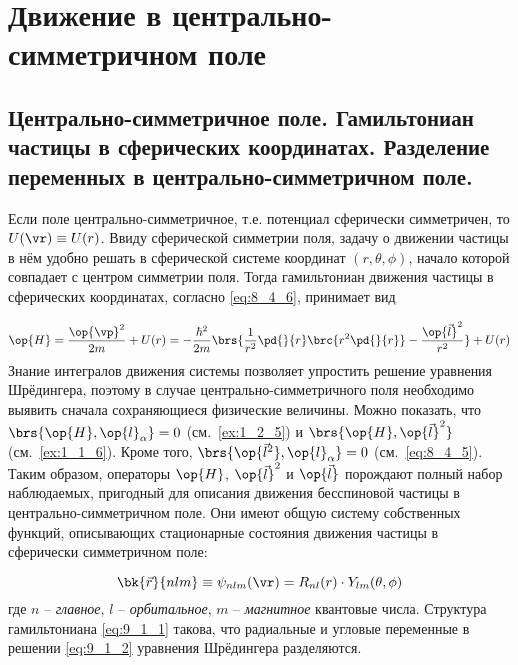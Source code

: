 \chapter{Движение в центрально-симметричном поле}

\begin{sloppypar}
\section{Центрально-симметричное поле. Гамильтониан частицы в сферических координатах. Разделение переменных в центрально-симметричном поле.}
\end{sloppypar}

Если поле центрально-симметричное, т.е. потенциал сферически симметричен, то $U(\vr) \equiv U(r)$. Ввиду сферической симметрии поля, задачу о движении частицы в нём удобно решать в сферической системе координат $(r, \theta, \phi)$, начало которой совпадает с центром симметрии поля. Тогда гамильтониан движения частицы в сферических координатах, согласно \eqref{eq:8_4_6}, принимает вид

\begin{equation}
\label{eq:9_1_1}
\op{H} = \frac{\op{\vp}^2}{2m} + U(r) = - \frac{\hbar^2}{2m} \brs{\frac{1}{r^2} \pd{}{r} \brc{r^2 \pd{}{r}} - \frac{\op{\vec{l}}^2}{r^2}} + U(r)
\end{equation}%
%
Знание интегралов движения системы позволяет упростить решение уравнения Шрёдингера, поэтому в случае центрально-симметричного поля необходимо выявить сначала сохраняющиеся физические величины. Можно показать, что $\brs{\op{H}, \op{l}_\alpha} = 0$ (см.~\cref{ex:1_2_5}) и $\brs{\op{H}, \op{\vec{l}}^2}$ (см.~\cref{ex:1_1_6}). Кроме того, $\brs{\op{\vec{l}^2}, \op{l}_\alpha} = 0$ (см.~\eqref{eq:8_4_5}). Таким образом, операторы $\op{H}$, $\op{\vec{l}}^2$ и $\op{\vec{l}}$ порождают полный набор наблюдаемых, пригодный для описания движения бесспиновой частицы в центрально-симметричном поле. Они имеют общую систему собственных функций, описывающих стационарные состояния движения частицы в сферически симметричном поле:

\begin{equation}
\label{eq:9_1_2}
\bk{\vec{r}}{nlm} \equiv \psi_{nlm}(\vr) = R_{nl}(r) \cdot Y_{lm}(\theta, \phi)
\end{equation}%
%
где $n$ -- {\em главное}, $l$ -- {\em орбитальное}, $m$ -- {\em магнитное} квантовые числа. Структура гамильтониана \eqref{eq:9_1_1} такова, что радиальные и угловые переменные в решении \eqref{eq:9_1_2} уравнения Шрёдингера разделяются.

